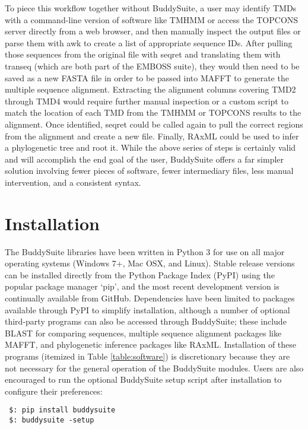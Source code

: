 \documentclass[nogrid]{MBE_article}%
\begin{document}
To piece this workflow together without BuddySuite, a user may identify TMDs with a command-line version of software like TMHMM \cite{Krogh:2001bv} or access the TOPCONS server directly from a web browser, and then manually inspect the output files or parse them with awk to create a list of appropriate sequence IDs. After pulling those sequences from the original file with seqret and translating them with transeq (which are both part of the EMBOSS suite), they would then need to be saved as a new FASTA file in order to be passed into MAFFT to generate the multiple sequence alignment. Extracting the alignment columns covering TMD2 through TMD4 would require further manual inspection or a custom script to match the location of each TMD from the TMHMM or TOPCONS results to the alignment. Once identified, seqret could be called again to pull the correct regions from the alignment and create a new file. Finally, RAxML \cite{Stamatakis:2006de} could be used to infer a phylogenetic tree and root it. While the above series of steps is certainly valid and will accomplish the end goal of the user, BuddySuite offers a far simpler solution involving fewer pieces of software, fewer intermediary files, less manual intervention, and a consistent syntax. 


\section{Installation}
The BuddySuite libraries have been written in Python 3 for use on all major operating systems (Windows 7+, Mac OSX, and Linux). Stable release versions can be installed directly from the Python Package Index (PyPI) using the popular package manager `pip', and the most recent development version is continually available from GitHub. Dependencies have been limited to packages available through PyPI to simplify installation, although a number of optional third-party programs can also be accessed through BuddySuite; these include BLAST \cite{Camacho2009} for comparing sequences, multiple sequence alignment packages like MAFFT, and phylogenetic inference packages like RAxML. Installation of these programs (itemized in Table \ref{table:software}) is discretionary because they are not necessary for the general operation of the BuddySuite modules. Users are also encouraged to run the optional BuddySuite setup script after installation to configure their preferences:

\smallskip
{\small
\begin{verbatim}
 $: pip install buddysuite
 $: buddysuite -setup
\end{verbatim}
}
\smallskip
\end{document}
